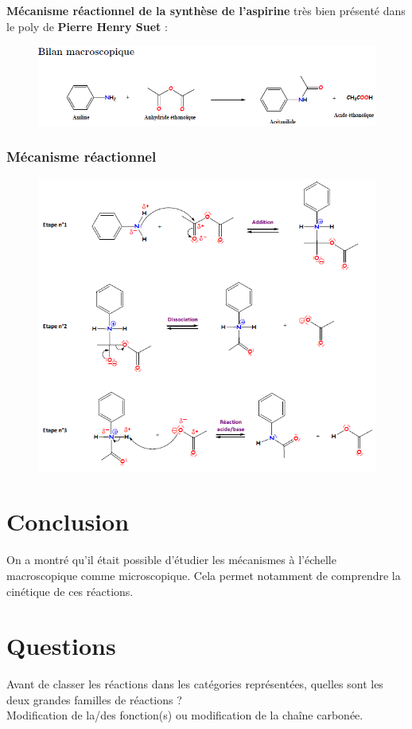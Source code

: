 \documentclass[12pt,prb,aps,epsf]{article}
\begin{document}
\textbf{Mécanisme réactionnel de la synthèse de l'aspirine} très bien présenté dans le poly de \textbf{Pierre Henry Suet} :
\begin{figure}[h]
	\centering \includegraphics[width=16cm]{aspi_macro}
\end{figure}
\subsubsection{Mécanisme réactionnel}

\begin{figure}[h!]
	\centering \includegraphics[width=14cm]{aspi_mecanisme_reac}
\end{figure}
\section{Conclusion}
On a montré qu'il était possible d'étudier les mécanismes à l'échelle macroscopique comme microscopique. Cela permet notamment de comprendre la cinétique de ces réactions.

\section*{Questions}
Avant de classer les réactions dans les catégories représentées, quelles sont les deux grandes familles de réactions ?\\
Modification de la/des fonction(s) ou modification de la chaîne carbonée.\\
\end{document}

